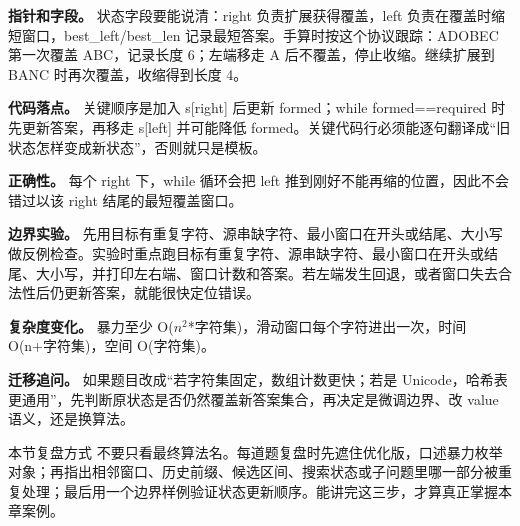 \textbf{指针和字段。} 状态字段要能说清：right 负责扩展获得覆盖，left 负责在覆盖时缩短窗口，best\_left/best\_len 记录最短答案。手算时按这个协议跟踪：ADOBEC 第一次覆盖 ABC，记录长度 6；左端移走 A 后不覆盖，停止收缩。继续扩展到 BANC 时再次覆盖，收缩得到长度 4。

\textbf{代码落点。} 关键顺序是加入 s[right] 后更新 formed；while formed==required 时先更新答案，再移走 s[left] 并可能降低 formed。关键代码行必须能逐句翻译成“旧状态怎样变成新状态”，否则就只是模板。

\textbf{正确性。} 每个 right 下，while 循环会把 left 推到刚好不能再缩的位置，因此不会错过以该 right 结尾的最短覆盖窗口。

\textbf{边界实验。} 先用目标有重复字符、源串缺字符、最小窗口在开头或结尾、大小写做反例检查。实验时重点跑目标有重复字符、源串缺字符、最小窗口在开头或结尾、大小写，并打印左右端、窗口计数和答案。若左端发生回退，或者窗口失去合法性后仍更新答案，就能很快定位错误。

\textbf{复杂度变化。} 暴力至少 O(\ensuremath{n^{2}}*字符集)，滑动窗口每个字符进出一次，时间 O(n+字符集)，空间 O(字符集)。

\textbf{迁移追问。} 如果题目改成“若字符集固定，数组计数更快；若是 Unicode，哈希表更通用”，先判断原状态是否仍然覆盖新答案集合，再决定是微调边界、改 value 语义，还是换算法。

\begin{principlebox}{本节复盘方式}
不要只看最终算法名。每道题复盘时先遮住优化版，口述暴力枚举对象；再指出相邻窗口、历史前缀、候选区间、搜索状态或子问题里哪一部分被重复处理；最后用一个边界样例验证状态更新顺序。能讲完这三步，才算真正掌握本章案例。
\end{principlebox}
